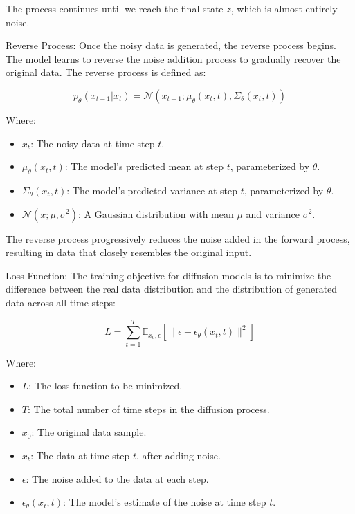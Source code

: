 The process continues until we reach the final state \(z\), which is almost entirely noise.

Reverse Process:
Once the noisy data is generated, the reverse process begins. The model learns to reverse the noise addition process to gradually recover the original data. The reverse process is defined as:

\begin{equation}
p_\theta(x_{t-1} | x_t) = \mathcal{N}(x_{t-1}; \mu_\theta(x_t, t), \Sigma_\theta(x_t, t))
\end{equation}

Where:
\begin{itemize}
    \item \(x_t\): The noisy data at time step \(t\).
    \item \(\mu_\theta(x_t, t)\): The model's predicted mean at step \(t\), parameterized by \(\theta\).
    \item \(\Sigma_\theta(x_t, t)\): The model's predicted variance at step \(t\), parameterized by \(\theta\).
    \item \(\mathcal{N}(x; \mu, \sigma^2)\): A Gaussian distribution with mean \(\mu\) and variance \(\sigma^2\).
\end{itemize}

The reverse process progressively reduces the noise added in the forward process, resulting in data that closely resembles the original input.

Loss Function:
The training objective for diffusion models is to minimize the difference between the real data distribution and the distribution of generated data across all time steps:

\begin{equation}
L = \sum_{t=1}^{T} \mathbb{E}_{x_0, \epsilon} [\|\epsilon - \epsilon_\theta(x_t, t)\|^2]
\end{equation}

Where:
\begin{itemize}
    \item \(L\): The loss function to be minimized.
    \item \(T\): The total number of time steps in the diffusion process.
    \item \(x_0\): The original data sample.
    \item \(x_t\): The data at time step \(t\), after adding noise.
    \item \(\epsilon\): The noise added to the data at each step.
    \item \(\epsilon_\theta(x_t, t)\): The model's estimate of the noise at time step \(t\).
\end{itemize}

